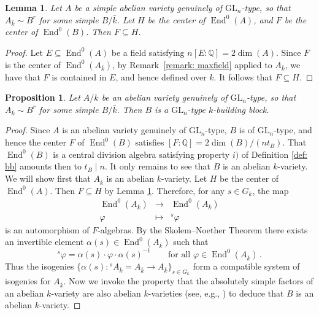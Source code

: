 \documentclass[oneside]{amsart}
\newtheorem{proposition}[theorem]{Proposition}
\newtheorem{lemma}[theorem]{Lemma}
\theoremstyle{remark}
\newcommand{\lra}{\longrightarrow}
\newcommand{\ra}{\rightarrow}
\newcommand{\Q}{\mathbb Q}
\newcommand{\kbar}{{\bar{k}}}
\newcommand{\GL}{\mathrm{GL}}
\newcommand{\End}{\operatorname{End}}
\numberwithin{equation}{section}
\begin{document}
\begin{lemma}\label{lemma: center-center-inclusion}
Let $A$ be a simple abelian variety genuinely of $\GL_n$-type, so that $A_{\bar k}\sim B^r$ for some simple $B/\kbar$. Let $H$ be the center of $\End^0(A)$, and $F$ be the center of $\End^0(B)$. Then $F\subseteq H$.
\end{lemma}

\begin{proof}
Let $E\subseteq \End^0(A)$ be a field satisfying $n[E:\Q]=2\dim(A)$. Since $F$ is the center of $\End^0(A_\kbar)$, by Remark~\ref{remark: maxfield} applied to $A_{\kbar}$, we have that $F$ is contained in $E$, and hence defined over $k$. It follows that $F\subseteq H$.
\end{proof}

\begin{proposition}
Let $A/k$ be an abelian variety genuinely of $\GL_n$-type, so that $A_\kbar\sim B^r$ for some simple $B/\kbar$. Then $B$ is a $\GL_n$-type $k$-building block.
\end{proposition}

\begin{proof}
Since $A$ is an abelian variety genuinely of $\GL_n$-type, $B$ is of $\GL_n$-type, and hence the center $F$ of $\End^0(B)$ satisfies $[F:\Q]=2\dim(B)/(nt_B)$. That $\End^0(B)$ is a central division algebra satisfying property $i)$ of Definition \ref{def: bb} amounts then to $t_B\mid n$. It only remains to see that $B$ is an abelian $k$-variety. We will show first that $A_\kbar$ is an abelian $k$-variety. Let $H$ be the center of $\End^0(A)$. Then $F\subseteq H$ by Lemma \ref{lemma: center-center-inclusion}. Therefore, for any $s\in G_k$, the map
\[
\begin{array}{ccc}
  \End^0(A_\kbar) & \lra & \End^0(A_\kbar)\\
\varphi & \longmapsto & {}^s \varphi
\end{array}
\]
is an automorphism of $F$-algebras. By the Skolem--Noether Theorem there exists an invertible element $\alpha(s)\in \End^0(A_\kbar)$ such that 
\begin{equation}\label{equation: alphacompatibility}
{}^s\varphi = \alpha(s) \cdot\varphi \cdot\alpha(s)^{-1}\qquad \text{for all $\varphi \in \End^0(A_\kbar)$}\,.
\end{equation} 
Thus the isogenies $\{\alpha(s) \colon {}^s A_{\kbar} = A_{\kbar} \ra A_{\kbar} \}_{s\in G_k}$ form a compatible system of isogenies for $A_{\kbar}$. Now we invoke the property that the absolutely simple factors of an abelian $k$-variety are also abelian $k$-varieties (see, e.g.,  \cite[Proposition 3.5]{Gui10}) to deduce that $B$ is an abelian $k$-variety.
\end{proof}
\end{document}
